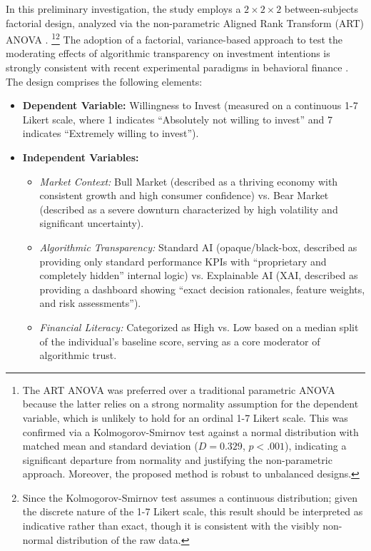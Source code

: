 \documentclass[10pt, a4paper]{article} %
\begin{document}
In this preliminary investigation, the study employs a $2 \times 2 \times 2$ between-subjects factorial design, analyzed via the non-parametric Aligned Rank Transform (ART) ANOVA \citep{wobbrock2011thealigned}. \footnote{The ART ANOVA was preferred over a traditional parametric ANOVA because the latter relies on a strong normality assumption for the dependent variable, which is unlikely to hold for an ordinal 1-7 Likert scale. This was confirmed via a Kolmogorov-Smirnov test against a normal distribution with matched mean and standard deviation ($D = 0.329$, $p < .001$), indicating a significant departure from normality and justifying the non-parametric approach. Moreover, the proposed method is robust to unbalanced designs.}\footnote{Since the Kolmogorov-Smirnov test assumes a continuous distribution; given the discrete nature of the 1-7 Likert scale, this result should be interpreted as indicative rather than exact, though it is consistent with the visibly non-normal distribution of the raw data.} The adoption of a factorial, variance-based approach to test the moderating effects of algorithmic transparency on investment intentions is strongly consistent with recent experimental paradigms in behavioral finance \citep{chang2026does}. The design comprises the following elements:
\begin{itemize}
    \item \textbf{Dependent Variable:} Willingness to Invest (measured on a continuous 1-7 Likert scale, where 1 indicates ``Absolutely not willing to invest'' and 7 indicates ``Extremely willing to invest'').
    \item \textbf{Independent Variables:} 
    \begin{itemize}
        \item \textit{Market Context:} Bull Market (described as a thriving economy with consistent growth and high consumer confidence) vs. Bear Market (described as a severe downturn characterized by high volatility and significant uncertainty).
        \item \textit{Algorithmic Transparency:} Standard AI (opaque/black-box, described as providing only standard performance KPIs with ``proprietary and completely hidden'' internal logic) vs. Explainable AI (XAI, described as providing a dashboard showing ``exact decision rationales, feature weights, and risk assessments'').
        \item \textit{Financial Literacy:} Categorized as High vs. Low based on a median split of the individual's baseline score, serving as a core moderator of algorithmic trust.
    \end{itemize}
\end{itemize}
\end{document}
